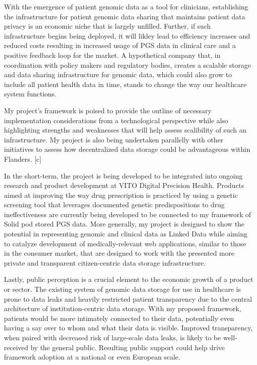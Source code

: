 \documentclass[runningheads]{llncs}
\begin{document}
With the emergence of patient genomic data as a tool for clinicians, establishing the infrastructure for patient genomic data sharing that maintains patient data privacy is an economic niche that is largely unfilled. 
Further, if such infrastructure begins being deployed, it will likley lead to efficiency increases and reduced costs resulting in increased usage of PGS data in clinical care and a positive feedback loop for the market.
A hypothetical company that, in coordination with policy makers and regulatory bodies, creates a scalable storage and data sharing infrastructure for genomic data, which could also grow to include all patient health data in time, stands to change the way our healthcare system functions. 

My project's framework is poised to provide the outline of necessary implementation considerations from a technological perspective while also highlighting strengths and weaknesses that will help assess scalibility of such an infrastructure. 
My project is also being undertaken parallelly with other initiatives to assess how decentralized data storage could be advantageous within Flanders. [c]

In the short-term, the project is being developed to be integrated into ongoing research and product development at VITO Digital Precision Health. 
Products aimed at improving the way drug prescription is practiced by using a genetic screening tool that leverages documented genetic predispositions to drug ineffectiveness are currently being developed to be connected to my framework of Solid pod stored PGS data. 
More generally, my project is designed to show the potential in representing genomic and clinical data as Linked Data while aiming to catalyze  development of medically-relevant web applications, similar to those in the consumer market, that are designed to work with the presented more private and transparent citizen-centric data storage infrastructure.

Lastly, public perception is a crucial element to the economic growth of a product or sector. 
The existing system of genomic data storage for use in healthcare is prone to data leaks and heavily restricted patient transparency due to the central architecture of institution-centric data storage. 
With my proposed framework, patients would be more intimately connected to their data, potentially even having a say over to whom and what their data is visible. 
Improved transparency, when paired with decreased risk of large-scale data leaks, is likely to be well-received by the general public. 
Resulting public support could help drive framework adoption at a national or even European scale. 
\end{document}

